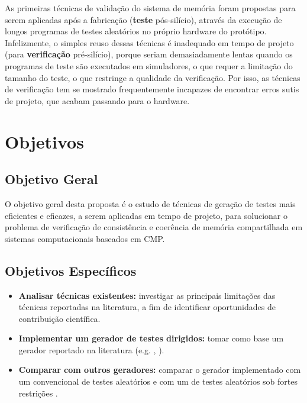 \documentclass{ufsc-thesis}
\begin{document}
As primeiras técnicas de validação do sistema de memória foram propostas para
serem aplicadas após a fabricação (\textbf{teste} pós-silício), através da
execução de longos programas de testes aleatórios no próprio hardware do
protótipo.  Infelizmente, o simples reuso dessas técnicas é inadequado em tempo
de projeto (para \textbf{verificação} pré-silício), porque seriam
demasiadamente lentas quando os programas de teste são executados em
simuladores, o que requer a limitação do tamanho do teste, o que restringe a
qualidade da verificação. Por isso, as técnicas de verificação tem se mostrado
frequentemente incapazes de encontrar erros sutis de projeto, que acabam
passando para o hardware.

\chapter{Objetivos}

\section{Objetivo Geral}
O objetivo geral desta proposta é o estudo de técnicas de geração
de testes mais eficientes e eficazes, a serem aplicadas em tempo de projeto,
para solucionar o problema de verificação de consistência e coerência de
memória compartilhada em sistemas computacionais baseados em CMP.



\section{Objetivos Específicos}
\begin{itemize}
    \item \textbf{Analisar técnicas existentes:} investigar as principais
        limitações das técnicas reportadas na literatura, a fim de identificar
        oportunidades de contribuição científica.
    \item \textbf{Implementar um gerador de testes dirigidos:} tomar como base um
        gerador reportado na literatura (e.g. \cite{Wagner:2008},
        \cite{Elver:2016}).
    \item \textbf{Comparar com outros geradores:} comparar o gerador implementado
        com um convencional de testes aleatórios \cite{Rambo:2011} e com um de
        testes aleatórios sob fortes restrições \cite{Andrade:2016a}.
\end{itemize}
\end{document}
